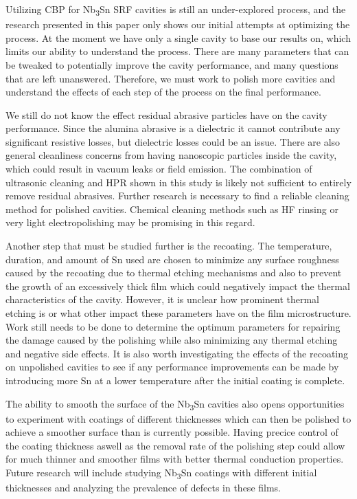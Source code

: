 \documentclass[reprint,amsmath,amssymb,aps]{revtex4-2}%
\begin{document}
Utilizing CBP for Nb\textsubscript{3}Sn SRF cavities is still an under-explored process, and the research presented in this paper only shows our initial attempts at optimizing the process. At the moment we have only a single cavity to base our results on, which limits our ability to understand the process. There are many parameters that can be tweaked to potentially improve the cavity performance, and many questions that are left unanswered. Therefore, we must work to polish more cavities and understand the effects of each step of the process on the final performance.

We still do not know the effect residual abrasive particles have on the cavity performance. Since the alumina abrasive is a dielectric it cannot contribute any significant resistive losses, but dielectric losses could be an issue. There are also general cleanliness concerns from having nanoscopic particles inside the cavity, which could result in vacuum leaks or field emission. The combination of ultrasonic cleaning and HPR shown in this study is likely not sufficient to entirely remove residual abrasives. Further research is necessary to find a reliable cleaning method for polished cavities. Chemical cleaning methods such as HF rinsing or very light electropolishing may be promising in this regard.

Another step that must be studied further is the recoating. The temperature, duration, and amount of Sn used are chosen to minimize any surface roughness caused by the recoating due to thermal etching mechanisms and also to prevent the growth of an excessively thick film which could negatively impact the thermal characteristics of the cavity. However, it is unclear how prominent thermal etching is or what other impact these parameters have on the film microstructure. Work still needs to be done to determine the optimum parameters for repairing the damage caused by the polishing while also minimizing any thermal etching and negative side effects. It is also worth investigating the effects of the recoating on unpolished cavities to see if any performance improvements can be made by introducing more Sn at a lower temperature after the initial coating is complete.

The ability to smooth the surface of the Nb\textsubscript{3}Sn cavities also opens opportunities to experiment with coatings of different thicknesses which can then be polished to achieve a smoother surface than is currently possible. Having precice control of the coating thickness aswell as the removal rate of the polishing step could allow for much thinner and smoother films with better thermal conduction properties. Future research will include studying Nb\textsubscript{3}Sn coatings with different initial thicknesses and analyzing the prevalence of defects in these films.
\end{document}

